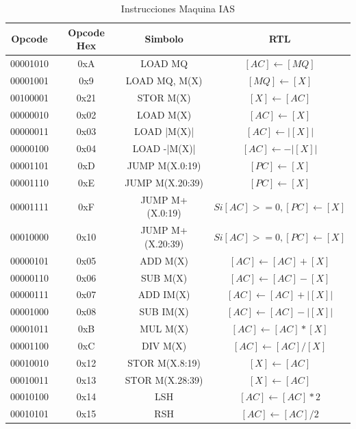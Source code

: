 \documentclass{article}
\begin{document}
\begin{table}[htbp]
  \caption{Instrucciones Maquina IAS}
  \label{tab:tablaISA-IAS}
  \centering
  \begin{tabular}{|cccc|}
    \hline
    Opcode   & Opcode Hex &  Simbolo          & RTL \\ \hline
    00001010 & 0xA        &  LOAD MQ          & $[AC]\leftarrow[MQ]$\\
    00001001 & 0x9        &  LOAD MQ, M(X)    & $[MQ]\leftarrow[X]$\\
    00100001 & 0x21       &  STOR M(X)        & $[X]\leftarrow[AC]$\\
    00000010 & 0x02       &  LOAD M(X)        & $[AC]\leftarrow[X]$\\
    00000011 & 0x03       &  LOAD |M(X)|      & $[AC]\leftarrow|[X]|$\\
    00000100 & 0x04       &  LOAD -|M(X)|     & $[AC]\leftarrow-|[X]|$\\
    00001101 & 0xD        &  JUMP M(X.0:19)   & $[PC]\leftarrow[X]$\\
    00001110 & 0xE        &  JUMP M(X.20:39)  & $[PC]\leftarrow[X]$\\
    00001111 & 0xF        &  JUMP M+(X.0:19)  & $Si [AC] >=0,  [PC]\leftarrow[X]$\\
    00010000 & 0x10       &  JUMP M+(X.20:39) & $Si [AC] >=0,  [PC]\leftarrow[X]$\\
    00000101 & 0x05       &  ADD M(X)         & $[AC]\leftarrow[AC]+[X]$\\
    00000110 & 0x06       &  SUB M(X)         & $[AC]\leftarrow[AC]-[X]$\\
    00000111 & 0x07       &  ADD IM(X)        & $[AC]\leftarrow[AC]+|[X]|$\\
    00001000 & 0x08       &  SUB IM(X)        & $[AC]\leftarrow[AC]-|[X]|$\\
    00001011 & 0xB        &  MUL M(X)         & $[AC]\leftarrow[AC]*[X]$\\
    00001100 & 0xC        &  DIV M(X)         & $[AC]\leftarrow[AC]/[X]$\\
    00010010 & 0x12       &  STOR M(X.8:19)   & $[X]\leftarrow[AC]$\\
    00010011 & 0x13       &  STOR M(X.28:39)  & $[X]\leftarrow[AC]$\\
    00010100 & 0x14       &  LSH              & $[AC]\leftarrow[AC]*2$\\
    00010101 & 0x15       &  RSH              & $[AC]\leftarrow[AC]/2$\\
    \hline
    
  \end{tabular}
\end{table}
\end{document}
